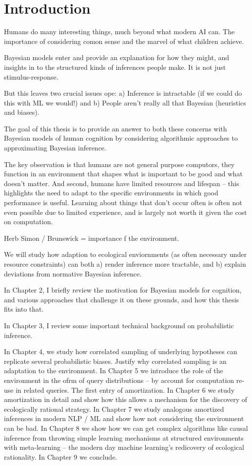 \chapter{Introduction}
\label{chap:intro}


Humans do many interesting things, much beyond what modern AI can.  The importance of considering comon sense and the marvel of what children achieve.

Bayesian models enter and provide an explanation for how they might, and insights in to the structured kinds of inferences people make. It is not just stimulus-response.

But this leaves two crucial issues ope: a) Inference is intractable (if we could do this with ML we would!) and b) People aren't really all that Bayesian (heuristics and biases). 

The goal of this thesis is to provide an answer to both these concerns with Bayesian models of human cognition by considering algorithmic approaches to approximating Bayesian inference.

The key observation is that humans are not general purpose computors, they function in an environment that shapes what is important to be good and what doesn't matter. And second, humans have limited resources and lifespan -- this highlights the need to adapt to the specific environments in which good performance is useful. Learning about things that don't occur often is often not even possible due to limited experience, and is largely not worth it given the cost on computation. 

Herb Simon / Brunswick = importance f the environment.

We will study how adaption to ecological enviornments (as often necessary under resource constraints) can both a) render inference more tractable, and b) explain deviations from normative Bayesian inference.

In Chapter 2, I briefly review the motivation for Bayesian models for cognition, and various approaches that challenge it on these grounds, and how this thesis fits into that.

In Chapter 3, I review some important technical background on probabilistic inference.

In Chapter 4, we study how correlated sampling of underlying hypotheses can replicate several probabilistic biases. Justify why correlated sampling is an adaptation to the environment. In Chapter 5 we introduce the role of the environment in the ofrm of query distributions -- by account for computation re-use in related queries. The first entry of amortization. In Chapter 6 we study amortization in detail and show how this allows a mechanism for the discovery of ecologically rational strategy. In Chapter 7 we study analogous amortized inferences in modern NLP / ML and show how not considering the environment can be bad. In Chapter 8 we show how we can get complex algorithms like causal inference from throwing simple learning mechanisms at structured environments with meta-learning -- the modern day machine learning's redicovery of ecological rationality. In Chapter 9 we conclude.

